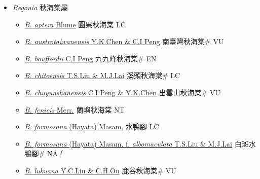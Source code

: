 
  \begin{itemize}
 \item[] \textit{Begonia} 秋海棠屬
                    
  \begin{itemize}
        \item[] \href{http://www.theplantlist.org/tpl1.1/search?q=Begonia+aptera}{\textit{B. aptera} Blume}   圓果秋海棠 LC
        \item[] \href{http://www.theplantlist.org/tpl1.1/search?q=Begonia+austrotaiwanensis}{\textit{B. austrotaiwanensis} Y.K.Chen \& C.I Peng}   南臺灣秋海棠\# VU
        \item[] \href{http://www.theplantlist.org/tpl1.1/search?q=Begonia+bouffordii}{\textit{B. bouffordii} C.I Peng}   九九峰秋海棠\# EN
        \item[] \href{http://www.theplantlist.org/tpl1.1/search?q=Begonia+chitoensis}{\textit{B. chitoensis} T.S.Liu \& M.J.Lai}   溪頭秋海棠\# LC
        \item[] \href{http://www.theplantlist.org/tpl1.1/search?q=Begonia+chuyunshanensis}{\textit{B. chuyunshanensis} C.I Peng \& Y.K.Chen}   出雲山秋海棠\# VU
        \item[] \href{http://www.theplantlist.org/tpl1.1/search?q=Begonia+fenicis}{\textit{B. fenicis} Merr.}   蘭嶼秋海棠 NT
        \item[] \href{http://www.theplantlist.org/tpl1.1/search?q=Begonia+formosana}{\textit{B. formosana} (Hayata) Masam.}   水鴨腳 LC
        \item[] \href{http://www.theplantlist.org/tpl1.1/search?q=Begonia+formosana+ f. +albomaculata}{\textit{B. formosana} (Hayata) Masam.  f.  \textit{albomaculata} T.S.Liu \& M.J.Lai}   白斑水鴨腳\# NA $^f$
        \item[] \href{http://www.theplantlist.org/tpl1.1/search?q=Begonia+lukuana}{\textit{B. lukuana} Y.C.Liu \& C.H.Ou}   鹿谷秋海棠\# VU

\end{itemize}
\end{itemize}
